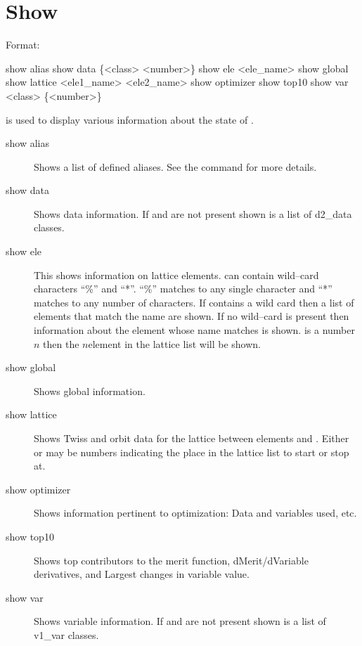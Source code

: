 \section{Show}
\label{s:show}

Format:
\begin{example}
  show alias                     
  show data \{<class> <number>\} 
  show ele <ele_name>
  show global
  show lattice <ele1_name> <ele2_name>
  show optimizer
  show top10
  show var <class> \{<number>\}
\end{example}

\vskip 0.2in
 is used to display various information about the state of \tao.
\begin{description}
\item[show alias]
Shows a list of defined aliases. See the  command for more details.
\item[show data]
Shows data information. If  and  are not present shown 
is a list of d2\_data classes.
\item[show ele]
This shows information on lattice elements.  can contain wild--card
characters ``\%'' and ``*''. ``\%'' matches to any single character and
``*'' matches to any number of characters. If  contains a
wild card then a list of elements that match the name are shown. If no wild--card
is present then information about the element whose name matches 
is shown.  is a number $n$ then the $n$\Th element in the lattice 
list will be shown.
\item[show global]
Shows global information.
\item[show lattice]
Shows Twiss and orbit data for the  lattice between elements
 and . Either  or
 may be numbers indicating the place in the lattice
list to start or stop at.
\item[show optimizer]
Shows information pertinent to optimization: Data and variables used, etc.
\item[show top10]
Shows top contributors to the merit function, dMerit/dVariable
derivatives, and Largest changes in variable value.
\item[show var]
Shows variable information. If  and  are not present shown 
is a list of v1\_var classes.
\end{description}

